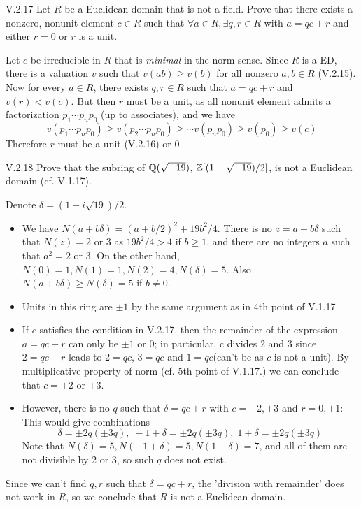 \begin{problem}{V.2.17}
Let $R$ be a Euclidean domain that is not a field. Prove that there exists a nonzero, nonunit element $c \in R$ such that $\forall a \in R, \exists q,r \in R$ with $a = qc+r$ and either $r = 0$ or $r$ is a unit.
\end{problem}
\begin{pf}
Let $c$ be irreducible in $R$ that is \emph{minimal} in the norm sense. Since $R$ is a ED, there is a valuation $v$ such that $v(ab) \geq v(b)$ for all nonzero $a,b \in R$ (V.2.15). Now for every $a \in R$, there exists $q,r \in R$ such that $a = qc+r$ and $v(r) < v(c)$. But then $r$ must be a unit, as all nonunit element admits a factorization $p_1\cdots p_np_0$ (up to associates), and we have
\[
v(p_1\cdots p_np_0) \geq v(p_2\cdots p_np_0) \geq \cdots v(p_np_0) \geq v(p_0) \geq v(c)
\]
Therefore $r$ must be a unit (V.2.16) or $0$.
\end{pf}

\begin{problem}{V.2.18}
Prove that the subring of $\mathbb{Q}(\sqrt{-19})$, $\mathbb{Z}[(1+\sqrt{-19})/2]$, is not a Euclidean domain (cf. V.1.17).
\end{problem}
\begin{pf}
Denote $\delta = (1+i\sqrt{19})/2$.
\begin{itemize}
	\setlength\itemsep{0pt}
	\item We have $N(a+b\delta) = (a+b/2)^2 + 19b^2/4$. There is no $z = a+b\delta$ such that $N(z) = 2$ or $3$ as $19b^2/4 > 4$ if $b \geq 1$, and there are no integers $a$ such that $a^2 = 2$ or $3$. On the other hand, $N(0) = 1, N(1) = 1, N(2) = 4, N(\delta) = 5$. Also $N(a+b\delta) \geq N(\delta) = 5$ if $b \neq 0$.
	\item Units in this ring are $\pm 1$ by the same argument as in 4th point of V.1.17.
	\item If $c$ satisfies the condition in V.2.17, then the remainder of the expression $a = qc + r$ can only be $\pm 1$ or $0$; in particular, c divides $2$ and $3$ since $2 = qc + r$ leads to $2 = qc$, $3 = qc$ and $1 = qc$(can't be as $c$ is not a unit). By multiplicative property of norm (cf. 5th point of V.1.17.) we can conclude that $c = \pm 2$ or $\pm 3$.
	\item However, there is no $q$ such that $\delta = qc + r$ with $c = \pm 2, \pm 3$ and $r = 0, \pm 1$: This would give combinations
	\[
	\delta = \pm 2q(\pm 3q), \; -1+\delta = \pm 2q(\pm 3q), \; 1+\delta = \pm 2q(\pm 3q)
	\]
	Note that $N(\delta) = 5, N(-1+\delta) = 5, N(1+\delta) = 7$, and all of them are not divisible by 2 or 3, so such $q$ does not exist.
\end{itemize}
Since we can't find $q,r$ such that $\delta = qc+r$, the 'division with remainder' does not work in $R$, so we conclude that $R$ is not a Euclidean domain.
\end{pf}